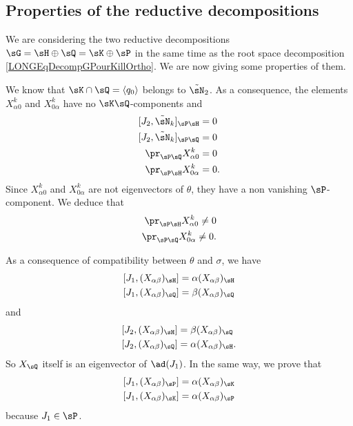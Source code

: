 %
\subsection{Properties of the reductive decompositions}
%
\label{LONGSubSecPropRedDecompQH}

We are considering the two reductive decompositions $\sG=\sH\oplus\sQ=\sK\oplus\sP$ in the same time as the root space decomposition \eqref{LONGEqDecompGPourKillOrtho}. We are now giving some properties of them.


We know that $\sK\cap\sQ=\langle q_0\rangle$ belongs to $\tilde\sN_2$. As a consequence, the elements $X^k_{\alpha 0}$ and $X^k_{0\alpha}$ have no $\sK\sQ$-components and
\begin{equation}
	\begin{aligned}[]
		[J_2,\tilde\sN_k]_{\sP\sH} & =0  \\
		[J_2,\tilde\sN_k]_{\sP\sQ} & =0  \\
		\pr_{\sP\sQ}X_{\alpha 0}^k & =0  \\
		\pr_{\sP\sH}X_{0\alpha }^k & =0.
	\end{aligned}
\end{equation}
Since $X^k_{\alpha 0}$ and $X^k_{0\alpha}$ are not  eigenvectors of $\theta$, they have a non vanishing $\sP$-component. We deduce that
\begin{equation}				\label{LONGEqXalphazeroaduPH}
	\begin{aligned}[]
		\pr_{\sP\sH}X^k_{\alpha 0}\neq 0 \\
		\pr_{\sP\sQ}X^k_{0 \alpha }\neq 0.
	\end{aligned}
\end{equation}

As a consequence of compatibility between $\theta$ and $\sigma$, we have
\begin{equation}
	\begin{aligned}[]
		[J_1,(X_{\alpha\beta})_{\sH}] & =\alpha (X_{\alpha\beta})_{\sH} \\
		[J_1,(X_{\alpha\beta})_{\sQ}] & =\beta (X_{\alpha\beta})_{\sQ}
	\end{aligned}
\end{equation}
and
\begin{equation}		\label{LONGSubEqsJdeuxXalphaneta}
	\begin{aligned}[]
		[J_2,(X_{\alpha\beta})_{\sH}] & =\beta (X_{\alpha\beta})_{\sQ}   \\
		[J_2,(X_{\alpha\beta})_{\sQ}] & =\alpha (X_{\alpha\beta})_{\sH}.
	\end{aligned}
\end{equation}
So $X_{\sQ}$ itself is an eigenvector of $\ad(J_1)$. In the same way, we prove that
\begin{equation}		\label{LONGEqJUnXabPK}
	\begin{aligned}[]
		[J_1,(X_{\alpha\beta})_{\sP}]=\alpha(X_{\alpha\beta})_{\sK} \\
		[J_1,(X_{\alpha\beta})_{\sK}]=\alpha(X_{\alpha\beta})_{\sP}
	\end{aligned}
\end{equation}
because $J_1\in\sP$.

